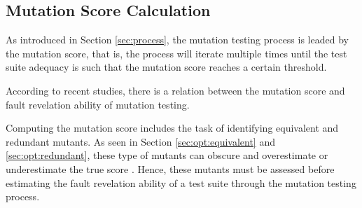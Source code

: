 
\subsection{Mutation Score Calculation}
\label{sub:mutationscore}


As introduced in Section \ref{sec:process}, the mutation testing process is leaded by the mutation score, that is, the process will iterate multiple times until the test suite adequacy is such that the mutation score reaches a certain threshold. 

According to recent studies, there is a relation between the mutation score and fault revelation ability of mutation testing.

Computing the mutation score includes the task of identifying equivalent and redundant mutants. As seen in Section \ref{sec:opt:equivalent} and \ref{sec:opt:redundant}, these type of mutants can obscure and overestimate or underestimate the true score \cite{papadakis2016threats,kintis2017detecting}.
Hence, these mutants must be assessed before estimating the fault revelation ability of a test suite through the mutation testing process.
